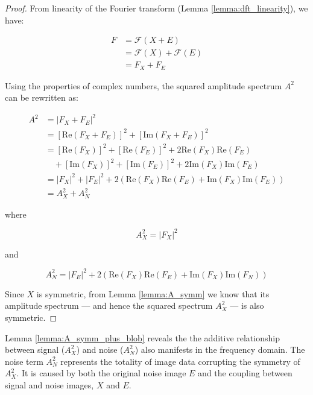 \begin{proof}

    From linearity of the Fourier transform (Lemma \ref{lemma:dft_linearity}), we have:

    \begin{align}
        F &= \mathcal{F}(X + E)\\
        &= \mathcal{F}(X) + \mathcal{F}(E)\\
        &= F_{X} + F_E
    \end{align}

    Using the properties of complex numbers, the squared amplitude spectrum $A^2$ can be rewritten as:

    \begin{align}
        A^2 &= |F_{X} + F_E|^2\\
        &= \left[\mathrm{Re}(F_{X} + F_E)\right]^2 + \left[\mathrm{Im}(F_{X} + F_E)\right]^2\\
        &= \left[\mathrm{Re}(F_{X})\right]^2 + \left[\mathrm{Re}(F_E)\right]^2 + 2\mathrm{Re}(F_{X})\mathrm{Re}(F_E) \nonumber \\
        & \quad + \left[\mathrm{Im}(F_{X})\right]^2 + \left[\mathrm{Im}(F_E)\right]^2 + 2\mathrm{Im}(F_{X})\mathrm{Im}(F_E)\\
        &= |F_{X}|^2 + |F_E|^2 + 2\left( \mathrm{Re}(F_{X})\mathrm{Re}(F_E) + \mathrm{Im}(F_{X})\mathrm{Im}(F_E) \right)\\
        &= A^2_{X} + A^2_N
    \end{align}

    where

    \begin{equation}
        A^2_{X} = |F_X|^2
    \end{equation}

    and

    \begin{equation}
         A^2_N = |F_E|^2 + 2\left( \mathrm{Re}(F_{X})\mathrm{Re}(F_E) + \mathrm{Im}(F_{X})\mathrm{Im}(F_N) \right)
    \end{equation}

    Since $X$ is symmetric, from Lemma \ref{lemma:A_symm} we know that its amplitude spectrum --- and hence the squared spectrum $A^2_{X}$ --- is also symmetric.
\end{proof}

Lemma \ref{lemma:A_symm_plus_blob} reveals the the additive relationship between signal ($A^2_{X}$) and noise ($A^2_N$) also manifests in the frequency domain. The noise term $A^2_N$ represents the totality of image data corrupting the symmetry of $A^2_{X}$. It is caused by both the original noise image $E$ and the coupling between signal and noise images, $X$ and $E$.

